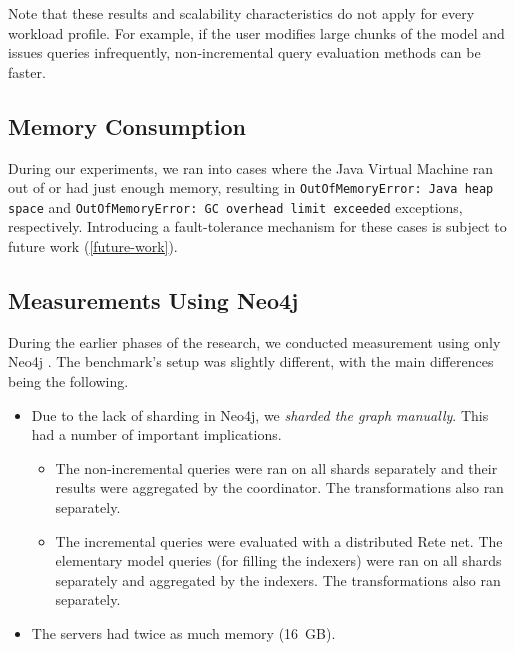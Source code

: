 Note that these results and scalability characteristics do not apply for every workload profile. For example, if the user modifies large chunks of the model and issues queries infrequently, non-incremental query evaluation methods can be faster. 


\subsection{Memory Consumption}

During our experiments, we ran into cases where the Java Virtual Machine ran out of or had just enough memory, resulting in \texttt{OutOfMemoryError: Java heap space} and \texttt{OutOfMemoryError: GC overhead limit exceeded} exceptions, respectively. Introducing a fault-tolerance mechanism for these cases is subject to future work (\autoref{future-work}).

\subsection{Measurements Using Neo4j}

During the earlier phases of the research, we conducted measurement using only Neo4j \cite{Izso:2012:ODD:2428516.2428523}. The benchmark's setup was slightly different, with the main differences being the following.

\begin{itemize}
  \item Due to the lack of sharding in Neo4j, we \emph{sharded the graph manually}. This had a number of important implications.
  \begin{itemize}
    \item The non-incremental queries were ran on all shards separately and their results were aggregated by the coordinator. The transformations also ran separately. 
    \item The incremental queries were evaluated with a distributed Rete net. The elementary model queries (for filling the indexers) were ran on all shards separately and aggregated by the indexers. The transformations also ran separately.
  \end{itemize}
  \item The servers had twice as much memory (16~GB).
\end{itemize}

